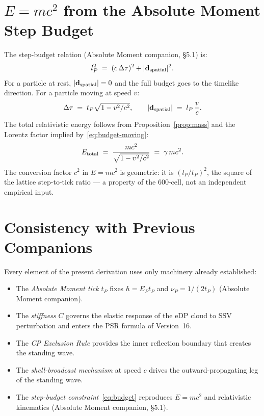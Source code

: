 \documentclass[12pt]{article}
\newcommand{\lP}{l_P}
\newcommand{\EP}{E_P}
\newcommand{\tP}{t_P}
\newcommand{\nuP}{\nu_P}
\begin{document}
\section{\boldmath$E = mc^2$ from the Absolute Moment Step Budget}
\label{sec:emc2}

The step-budget relation (Absolute Moment companion, \S5.1) is:
\begin{equation}
  \lP^2 \;=\; (c\,\Delta\tau)^2 + |\mathbf{d}_{\rm spatial}|^2.
  \label{eq:budget}
\end{equation}
For a particle at rest, $|\mathbf{d}_{\rm spatial}|=0$ and the full budget
goes to the timelike direction.  For a particle moving at speed $v$:
\begin{equation}
  \Delta\tau \;=\; \tP\sqrt{1 - v^2/c^2},
  \qquad
  |\mathbf{d}_{\rm spatial}| \;=\; \lP\,\frac{v}{c}.
  \label{eq:budget-moving}
\end{equation}
The total relativistic energy follows from Proposition~\ref{prop:mass} and
the Lorentz factor implied by~\eqref{eq:budget-moving}:
\begin{equation}
  E_{\rm total} \;=\; \frac{mc^2}{\sqrt{1-v^2/c^2}} \;=\; \gamma\,mc^2.
  \label{eq:relativistic-energy}
\end{equation}
The conversion factor $c^2$ in $E = mc^2$ is geometric: it is
$(\lP/\tP)^2$, the square of the lattice step-to-tick ratio --- a property
of the 600-cell, not an independent empirical input.

\section{Consistency with Previous Companions}
\label{sec:consistency}

Every element of the present derivation uses only machinery already
established:

\begin{itemize}[noitemsep]
  \item The \emph{Absolute Moment tick} $\tP$ fixes $\hbar = \EP\tP$ and
    $\nuP = 1/(2\tP)$ (Absolute Moment companion).
  \item The \emph{stiffness $C$} governs the elastic response of the eDP
    cloud to SSV perturbation and enters the PSR formula of Version~16.
  \item The \emph{CP Exclusion Rule} provides the inner reflection boundary
    that creates the standing wave.
  \item The \emph{shell-broadcast mechanism} at speed $c$ drives the
    outward-propagating leg of the standing wave.
  \item The \emph{step-budget constraint}~\eqref{eq:budget} reproduces
    $E=mc^2$ and relativistic kinematics (Absolute Moment companion, \S5.1).
\end{itemize}
\end{document}

